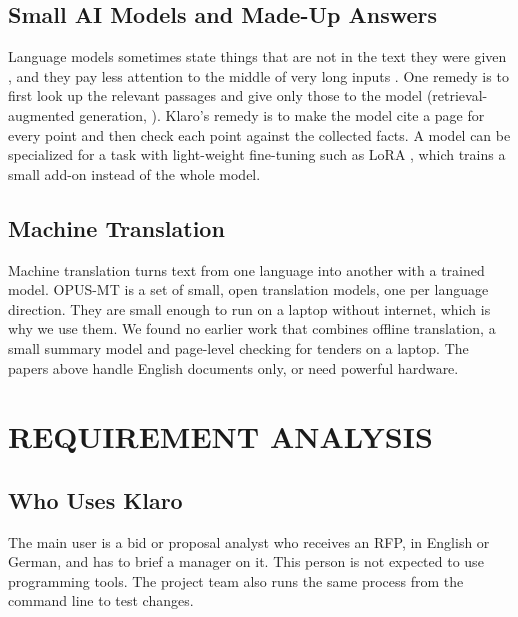 \documentclass[11pt,a4paper,oneside]{report}
\newcommand{\nonum}{}%
\begin{document}
\section{Small AI Models and Made-Up Answers}
Language models sometimes state things that are not in the text they were given
\cite{ji2023hallucination,maynez2020}, and they pay less attention to the middle of very long inputs
\cite{liu2024lost}. One remedy is to first look up the relevant passages and give only those to the
model (retrieval-augmented generation, \cite{lewis2020rag}). Klaro's remedy is to make the model
cite a page for every point and then check each point against the collected facts. A model can be
specialized for a task with light-weight fine-tuning such as LoRA \cite{hu2022lora}, which trains a
small add-on instead of the whole model.

\section{Machine Translation}
Machine translation turns text from one language into another with a trained model. OPUS-MT
\cite{tiedemann2020opusmt} is a set of small, open translation models, one per language direction.
They are small enough to run on a laptop without internet, which is why we use them. We found no
earlier work that combines offline translation, a small summary model and page-level checking for
tenders on a laptop. The papers above handle English documents only, or need powerful hardware.

\chapter{REQUIREMENT ANALYSIS}\nonum

\section{Who Uses Klaro}
The main user is a bid or proposal analyst who receives an RFP, in English or German, and has to
brief a manager on it. This person is not expected to use programming tools. The project team also
runs the same process from the command line to test changes.
\end{document}
